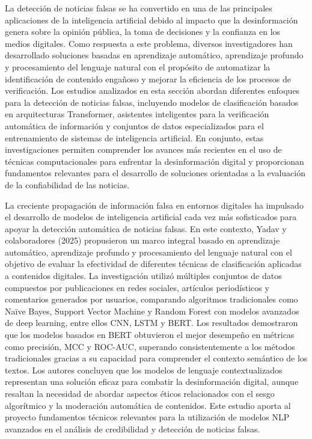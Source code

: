 \documentclass[12pt]{article}
\begin{document}
La detección de noticias falsas se ha convertido en una de las principales aplicaciones de la inteligencia artificial debido al impacto que la desinformación genera sobre la opinión pública, la toma de decisiones y la confianza en los medios digitales. Como respuesta a este problema, diversos investigadores han desarrollado soluciones basadas en aprendizaje automático, aprendizaje profundo y procesamiento del lenguaje natural con el propósito de automatizar la identificación de contenido engañoso y mejorar la eficiencia de los procesos de verificación. Los estudios analizados en esta sección abordan diferentes enfoques para la detección de noticias falsas, incluyendo modelos de clasificación basados en arquitecturas Transformer, asistentes inteligentes para la verificación automática de información y conjuntos de datos especializados para el entrenamiento de sistemas de inteligencia artificial. En conjunto, estas investigaciones permiten comprender los avances más recientes en el uso de técnicas computacionales para enfrentar la desinformación digital y proporcionan fundamentos relevantes para el desarrollo de soluciones orientadas a la evaluación de la confiabilidad de las noticias. 

La creciente propagación de información falsa en entornos digitales ha impulsado el desarrollo de modelos de inteligencia artificial cada vez más sofisticados para apoyar la detección automática de noticias falsas. En este contexto, Yadav y colaboradores (2025) propusieron un marco integral basado en aprendizaje automático, aprendizaje profundo y procesamiento del lenguaje natural con el objetivo de evaluar la efectividad de diferentes técnicas de clasificación aplicadas a contenidos digitales. La investigación utilizó múltiples conjuntos de datos compuestos por publicaciones en redes sociales, artículos periodísticos y comentarios generados por usuarios, comparando algoritmos tradicionales como Naïve Bayes, Support Vector Machine y Random Forest con modelos avanzados de deep learning, entre ellos CNN, LSTM y BERT. Los resultados demostraron que los modelos basados en BERT obtuvieron el mejor desempeño en métricas como precisión, MCC y ROC-AUC, superando consistentemente a los métodos tradicionales gracias a su capacidad para comprender el contexto semántico de los textos. Los autores concluyen que los modelos de lenguaje contextualizados representan una solución eficaz para combatir la desinformación digital, aunque resaltan la necesidad de abordar aspectos éticos relacionados con el sesgo algorítmico y la moderación automática de contenidos. Este estudio aporta al proyecto fundamentos técnicos relevantes para la utilización de modelos NLP avanzados en el análisis de credibilidad y detección de noticias falsas.
\end{document}
